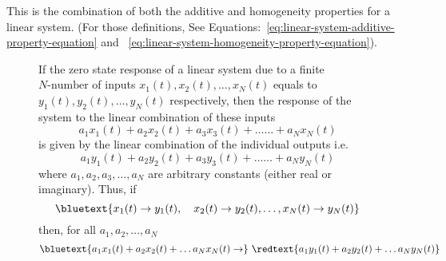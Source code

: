 \documentclass[../notes-main.tex]{subfiles}
\begin{document}
\subsubsection{}
This is the combination of both the additive and homogeneity properties for a linear system. (For those definitions, See Equations:~\ref{eq:linear-system-additive-property-equation} and ~\ref{eq:linear-system-homogeneity-property-equation}).
\begin{figure}[H]
    \begin{mdframed}
        \begin{center}
            If the zero state response of a linear system due to a finite \(N\text{-number}\) of inputs \(x_1(t), x_2(t), \dots, x_N(t)\) equals to \(y_1(t), y_2(t), \dots, y_N(t)\) respectively, then the response of the system to the linear combination of these inputs
            \begin{equation}
                a_1x_1(t) + a_2x_2(t) + a_3x_3(t) + \dots\dots + a_Nx_N(t)
                \label{eq:linear-superposition-input-equation}
            \end{equation}
            \noindent is given by the linear combination of the individual outputs i.e.
            \begin{equation}
                a_1y_1(t) + a_2y_2(t) + a_3y_3(t) + \dots\dots + a_Ny_N(t)
                \label{eq:linear-superposition-output-equation}
            \end{equation}
            \noindent where \(a_1, a_2, a_3, \dots, a_N\) are arbitrary constants (either real or imaginary).   
            Thus, if 
            \begin{equation}
                \bluetext{x_1(t) \rightarrow y_1(t), \quad x_2(t) \rightarrow y_2(t), \dots, x_N(t) \rightarrow y_N(t)}
                \label{eq:linear-superposition-equation-noconstants}
            \end{equation}
            then, for all \(a_1, a_2, \dots, a_N\)
            \begin{equation}
                \bluetext{a_1x_1(t) + a_2x_2(t) + \ldots  a_Nx_N(t)\rightarrow}\ \redtext{ a_1y_1(t) + a_2y_2(t) + \ldots  a_Ny_N(t)}
                \label{eq:linear-superposition-equation-constants}
            \end{equation}
\end{center}
\end{mdframed}
\end{figure}
\end{document}
